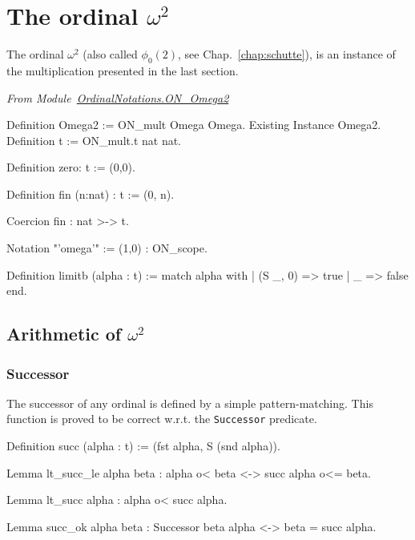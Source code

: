 \section{The ordinal \texorpdfstring{$\omega^2$}{omega2}}

The ordinal $\omega^2$ (also called $\phi_0(2)$, see Chap.~\ref{chap:schutte}), is an instance of the multiplication presented in the last section.

\vspace{4pt}
\noindent\emph{From Module~\href{../theories/html/hydras.OrdinalNotations.ON_Omega2.html}{OrdinalNotations.ON\_Omega2}}

\begin{Coqsrc}
Definition Omega2 := ON_mult Omega Omega.
Existing Instance Omega2.
Definition t := ON_mult.t nat nat.
\end{Coqsrc}



\begin{Coqsrc}
Definition zero: t := (0,0).

Definition fin (n:nat) : t := (0, n).

Coercion fin : nat >-> t.

Notation "'omega'" := (1,0) : ON_scope.

Definition limitb (alpha : t) := 
 match alpha with
 |  (S _, 0) => true
 | _ => false
end.
\end{Coqsrc}




\subsection{Arithmetic of \texorpdfstring{$\omega^2$}{omega^2}} 

\subsubsection{Successor}

The successor of any ordinal is defined by a simple pattern-matching.
This function is proved to be correct w.r.t. the \texttt{Successor} predicate.

\begin{Coqsrc}
Definition succ (alpha : t) := (fst alpha, S (snd alpha)).
\end{Coqsrc}

\begin{Coqsrc}
Lemma lt_succ_le alpha beta : alpha o< beta <-> succ alpha o<= beta.

Lemma lt_succ alpha : alpha o< succ alpha.

Lemma succ_ok alpha beta : Successor beta alpha <-> beta = succ alpha.
\end{Coqsrc}

